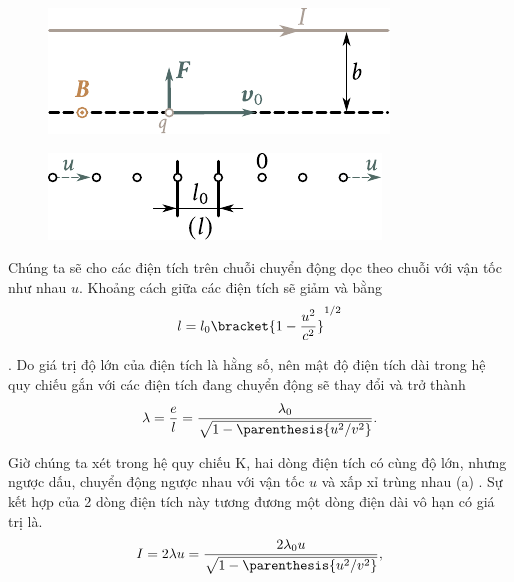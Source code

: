 \begin{figure}[t]
	\begin{minipage}[t]{0.48\linewidth}
		\begin{center}
			\includegraphics[scale=1]{figures/ch_06/fig_6_11.pdf}
			\caption[]{}
			\label{fig:6_11}
		\end{center}
	\end{minipage}
	\hfill{ }%
	\begin{minipage}[t]{0.48\linewidth}
		\begin{center}
			\includegraphics[scale=1]{figures/ch_06/fig_6_12.pdf}
			\caption[]{}
			\label{fig:6_12}
		\end{center}
	\end{minipage}
\vspace{-0.4cm}
\end{figure}

\noindent
Chúng ta sẽ cho các điện tích trên chuỗi chuyển động dọc theo chuỗi với vận tốc như nhau $u$. Khoảng cách giữa các điện tích sẽ giảm và bằng
\begin{equation*}
    l = l_0 \bracket{1 - \frac{u^2}{c^2}}^{1/2}
\end{equation*}

. Do giá trị độ lớn của điện tích là hằng số, nên mật độ điện tích dài trong hệ quy chiếu gắn với các điện tích đang chuyển động sẽ thay đổi và trở thành 
\begin{equation}\label{eq:6_49}
    \lambda = \frac{e}{l} = \frac{\lambda_0}{\sqrt{1 - \parenthesis{u^2/v^2}}}.
\end{equation}

Giờ chúng ta xét trong hệ quy chiếu K, hai dòng điện tích có cùng độ lớn, nhưng ngược dấu, chuyển động ngược nhau với vận tốc $u$  và xấp xỉ trùng nhau (a) . Sự kết hợp của 2 dòng điện tích này tương đương một dòng điện dài vô hạn có giá trị là. 
\begin{equation}\label{eq:6_50}
    I = 2 \lambda u = \frac{2 \lambda_0 u}{\sqrt{1 - \parenthesis{u^2/v^2}}},
\end{equation}

